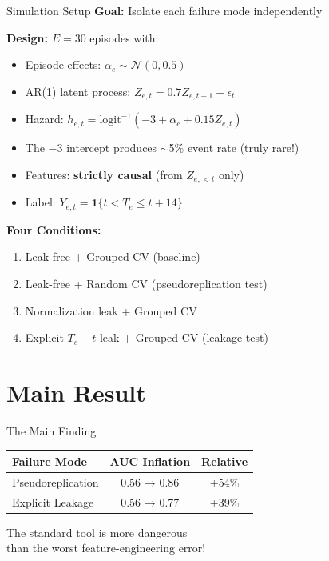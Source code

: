\documentclass[aspectratio=169]{beamer}
\begin{document}
\begin{frame}{Simulation Setup}
\textbf{Goal:} Isolate each failure mode independently

\vspace{0.5em}
\textbf{Design:} $E = 30$ episodes with:
\begin{itemize}
\item Episode effects: $\alpha_e \sim \mathcal{N}(0, 0.5)$
\item AR(1) latent process: $Z_{e,t} = 0.7 Z_{e,t-1} + \epsilon_t$
\item Hazard: $h_{e,t} = \text{logit}^{-1}(-3 + \alpha_e + 0.15 Z_{e,t})$
\item {} The $-3$ intercept produces \alert{$\sim$5\% event rate} (truly rare!)
\item Features: \textbf{strictly causal} (from $Z_{e,<t}$ only)
\item Label: $Y_{e,t} = \mathbf{1}\{t < T_e \leq t+14\}$
\end{itemize}

\vspace{0.5em}
\textbf{Four Conditions:}
\begin{enumerate}
\item Leak-free + Grouped CV \hfill (baseline)
\item Leak-free + Random CV \hfill \alert{(pseudoreplication test)}
\item Normalization leak + Grouped CV
\item Explicit $T_e - t$ leak + Grouped CV \hfill \alert{(leakage test)}
\end{enumerate}
\end{frame}

\section{Main Result}

\begin{frame}{The Main Finding}
\begin{center}
\LARGE{}

\vspace{2em}
\begin{tabular}{lcc}
\toprule
\textbf{Failure Mode} & \textbf{AUC Inflation} & \textbf{Relative} \\
\midrule
\alert{Pseudoreplication} & 0.56 → 0.86 & \alert{+54\%} \\
Explicit Leakage & 0.56 → 0.77 & +39\% \\
\bottomrule
\end{tabular}

\vspace{2em}
\Large
\alert{The standard tool is more dangerous}\\
\alert{than the worst feature-engineering error!}
\end{center}
\end{frame}
\end{document}
